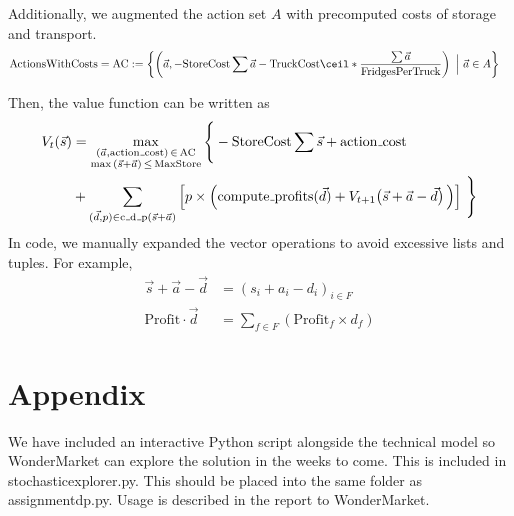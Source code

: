 \documentclass[11pt,a4paper]{article}
\begin{document}
Additionally, we augmented the action set $A$ with precomputed costs of storage and transport.
\begin{align*}
    \mathrm{ActionsWithCosts} = \mathrm{AC} &:= \left\{ \left(\vec a, 
    -\mathrm{StoreCost}\sum\vec a 
        -\mathrm{TruckCost} \ceil*{\frac{\sum \vec a}{\mathrm{FridgesPerTruck}}} \right) ~\Big|~ \vec a \in A\right\}
\end{align*}

Then, the value function can be written as 
\begin{align*}
    V_{t}(\vec s) &= 
    \max_{ \substack{(\vec a, \mathrm{action{\mathunderscore}cost}) \,\in\, \mathrm{AC} \\ \max \,(\vec s + \vec a)\, \le\, \mathrm{MaxStore} } }\Bigg\{
        -\mathrm{StoreCost}\sum\vec s  + \mathrm{action{\mathunderscore}cost}\\ 
        &   + \sum_{(\vec d, p) \in \mathrm{c{\mathunderscore}d{\mathunderscore}p}(\vec s + \vec a)} \Big[p\times \Big( \mathrm{compute{\mathunderscore}profits} (\vec d)
         + V_{t+1} \big(\vec s + \vec a - \vec d\big)\,\Big) \Big]\,\,\Bigg\}
\end{align*}
In code, we manually expanded the vector operations to avoid excessive lists and tuples. For example, 
\begin{align*}
    \vec s + \vec a - \vec d &= (s_i+a_i-d_i)_{i\in F} \\ 
    \mathrm{Profit} \cdot\vec d &= \sum_{f \in F} (\mathrm{Profit}_f \times d_f)
\end{align*}

\part{Appendix}
We have included an interactive Python script alongside the technical model 
so WonderMarket can explore the solution in the weeks to come. This is included
in stochastic{\textunderscore}explorer.py. This should be placed into the same 
folder as assignment{\textunderscore}dp.py. Usage is described in the report 
to WonderMarket.
\end{document}
